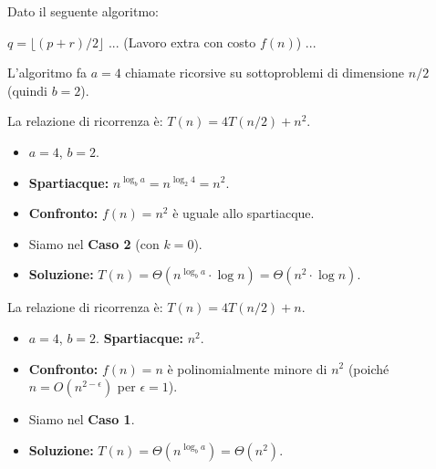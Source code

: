 \begin{example}
Dato il seguente algoritmo:
\begin{algorithmic}[1]
        \State $q = \lfloor (p+r)/2 \rfloor$
        \State {} 
        \State {} 
        \State {} 
        \State {} 
        \State ... (Lavoro extra con costo $f(n)$) ...
    \EndIf
\EndProcedure
\end{algorithmic}

L'algoritmo fa $a=4$ chiamate ricorsive su sottoproblemi di dimensione $n/2$ (quindi $b=2$).

\begin{observation}[Caso Pessimo: $f(n) = n^2$]
La relazione di ricorrenza è: $T(n) = 4T(n/2) + n^2$.
\begin{itemize}
    \item $a = 4$, $b = 2$.
    \item \textbf{Spartiacque:} $n^{\log_b a} = n^{\log_2 4} = n^2$.
    \item \textbf{Confronto:} $f(n) = n^2$ è uguale allo spartiacque.
    \item Siamo nel \textbf{Caso 2} (con $k=0$).
    \item \textbf{Soluzione:} $T(n) = \Theta(n^{\log_b a} \cdot \log n) = \Theta(n^2 \cdot \log n)$.
\end{itemize}
\end{observation}

\begin{observation}[Caso Ottimo (ipotetico): $f(n) = n$]
La relazione di ricorrenza è: $T(n) = 4T(n/2) + n$.
\begin{itemize}
    \item $a = 4$, $b = 2$. \textbf{Spartiacque:} $n^2$.
    \item \textbf{Confronto:} $f(n) = n$ è polinomialmente minore di $n^2$ (poiché $n = O(n^{2-\epsilon})$ per $\epsilon=1$).
    \item Siamo nel \textbf{Caso 1}.
    \item \textbf{Soluzione:} $T(n) = \Theta(n^{\log_b a}) = \Theta(n^2)$.
\end{itemize}
\end{observation}

\end{example}
\newpage